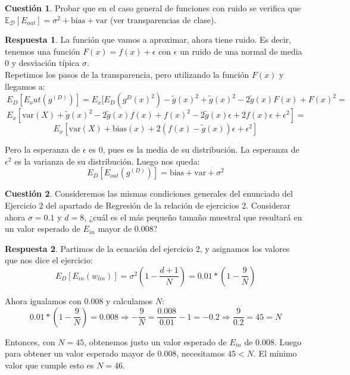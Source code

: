 \documentclass[10pt,a4paper]{article}
\theoremstyle{definition}
\newtheorem{cuestion}{Cuestión}
\newtheorem*{respuesta}{Respuesta}
\begin{document}
\begin{cuestion}
Probar que en el caso general de funciones con ruido se verifica que $\mathbb{E}_{\mathcal{D}}[E_{out}]=\sigma^2+\textrm{bias}+\textrm{var}$ (ver transparencias de clase).
\end{cuestion}
\begin{respuesta}
La función que vamos a aproximar, ahora tiene ruido. Es decir, tenemos una función $F(x) = f(x) +\epsilon$ con $\epsilon$ un ruido de una normal de media 0 y desviación típica $\sigma$.\\

Repetimos los pasos de la transparencia, pero utilizando la función $F(x)$ y llegamos a:\\
\[
\ E_D[E_out(g^{(D)})] = E_x[E_D(g^{D}(x)^2)- \tilde{g}(x)^2 + \tilde{g}(x)^2-2\tilde{g}(x)F(x)+F(x)^2 =
\]
\[
\ E_x[\textrm{var}(X)+ \tilde{g}(x)^2-2\tilde{g}(x)f(x)+f(x)^2-2\tilde{g}(x)\epsilon+2f(x)\epsilon+\epsilon^2] = 
\]
\[
\ E_x[\textrm{var}(X)+\textrm{bias}(x)+2(f(x)-\tilde{g}(x))\epsilon+\epsilon^2]
\]

Pero la esperanza de $\epsilon$ es 0, pues es la media de su distribución. La esperanza de $\epsilon^2$ es la varianza de su distribución. Luego nos queda:
\[
\ E_D[E_{out}(g^{(D)})] = \textrm{bias}+\textrm{var}+\sigma^2
\]
\end{respuesta}

\begin{cuestion}
Consideremos las mismas condiciones generales del enunciado del Ejercicio 2 del apartado de Regresión de la relación de ejercicios 2. Considerar ahora $\sigma=0.1$ y $d=8$, ¿cuál es el más pequeño tamaño muestral que resultará en un valor esperado de $E_{in}$ mayor de 0.008?
\end{cuestion}
\begin{respuesta}

Partimos de la ecuación del ejercicio 2, y asignamos los valores que nos dice el ejercicio:\\
\[
\ E_D[E_{in}(w_{lin})] = \sigma^2\left(1-\frac{d+1}{N}\right) = 0.01*\left(1-\frac{9}{N}\right)
\]

Ahora igualamos con $0.008$ y calculamos $N$:\\
\[
\ 0.01*\left(1-\frac{9}{N}\right) = 0.008\Rightarrow-\frac{9}{N} = \frac{0.008}{0.01}-1 = -0.2 \Rightarrow \frac{9}{0.2} = 45 = N
\]

Entonces, con $N=45$, obtenemos justo un valor esperado de $E_{in}$ de $0.008$. Luego para obtener un valor esperado mayor de $0.008$, necesitamos $45<N$. El mínimo valor que cumple esto es $N=46$.
\end{respuesta}
\end{document}
